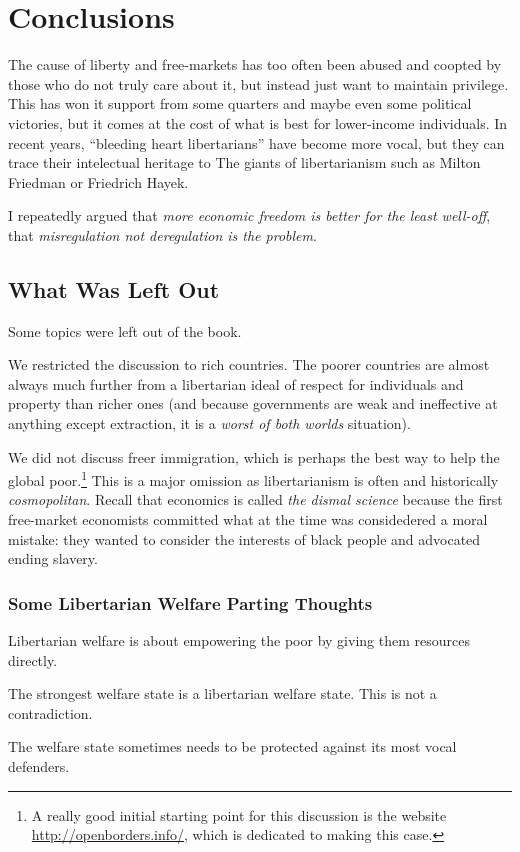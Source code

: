 \chapter{Conclusions}

The cause of liberty and free-markets has too often been abused and coopted by
those who do not truly care about it, but instead just want to maintain
privilege. This has won it support from some quarters and maybe even some
political victories, but it comes at the cost of what is best for lower-income
individuals. In recent years, ``bleeding heart libertarians'' have become more
vocal, but they can trace their intelectual heritage to The giants of
libertarianism such as Milton Friedman or Friedrich Hayek.

I repeatedly argued that \emph{more economic freedom is better for the least
well-off}, that \emph{misregulation not deregulation is the problem}.

\section{What Was Left Out}

Some topics were left out of the book.

We restricted the discussion to rich countries. The poorer countries are almost
always much further from a libertarian ideal of respect for individuals and
property than richer ones (and because governments are weak and ineffective at
anything except extraction, it is a \emph{worst of both worlds} situation).

We did not discuss freer immigration, which is perhaps the best way to help the
global poor.\footnote{A really good initial starting point for this discussion
is the website \url{http://openborders.info/}, which is dedicated to making
this case.} This is a major omission as libertarianism is often and
historically \emph{cosmopolitan}. Recall that economics is called \emph{the
dismal science} because the first free-market economists committed what at the
time was considedered a moral mistake: they wanted to consider the interests of
black people and advocated ending slavery.

\subsection{Some Libertarian Welfare Parting Thoughts}

\thought Libertarian welfare is about empowering the poor by giving them
resources directly.

\thought The strongest welfare state is a libertarian welfare state. This is
not a contradiction.

\thought The welfare state sometimes needs to be protected against its most
vocal defenders.

